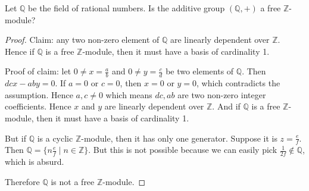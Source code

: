 \begin{exercise}
    Let $\mathbb{Q}$ be the field of rational numbers. Is the additive group $(\mathbb{Q},+)$ a free $\mathbb{Z}$-module?
\end{exercise}

\begin{proof}
    Claim: any two non-zero element of $\mathbb{Q}$ are linearly dependent over $\mathbb{Z}$. Hence if $\mathbb{Q}$ is a free $\mathbb{Z}$-module, then it must have a
    basis of cardinality 1.

    Proof of claim: let $0 \neq x = \frac{a}{b}$ and $0 \neq y =\frac{c}{d}$ be two
    elements of $\mathbb{Q}$. Then $dcx - aby=0$. If $a=0$ or $c=0$, then $x=0$ or $y=0$,
    which contradicts the assumption. Hence $a, c \neq 0$ which means $dc,ab$ are two
    non-zero integer coefficients. Hence $x$ and $y$ are linearly dependent over $\mathbb{Z}$. And if $\mathbb{Q}$ is a free $\mathbb{Z}$-module, then it must have a
    basis of cardinality 1.

    But if $\mathbb{Q}$ is a cyclic $\mathbb{Z}$-module, then it has only one generator.
    Suppose it is $z=\frac{e}{f}$. Then $\mathbb{Q}=\{n \frac{e}{f} \mid n \in \mathbb{Z}\}$.
    But this is not possible because we can easily pick $\frac{1}{2f} \notin \mathbb{Q}$,
    which is absurd.

    Therefore $\mathbb{Q}$ is not a free $\mathbb{Z}$-module.
\end{proof}

